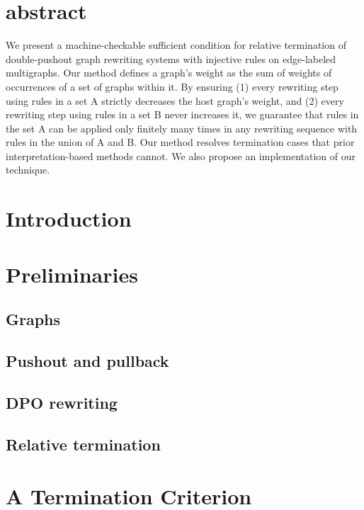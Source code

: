 \documentclass{book}
\begin{document}
\section{abstract}
We present a machine-checkable sufficient condition for relative termination of double-pushout graph rewriting systems with injective rules on edge-labeled multigraphs. 
Our method defines a graph's weight as the sum of weights of occurrences of a set of graphs within it. By ensuring 
(1) every rewriting step using rules in a set A strictly decreases the host graph's weight, and 
(2) every rewriting step using rules in a set B never increases it, we guarantee that rules in the set A can be applied only finitely many times in any rewriting sequence with rules in the union of A and B.  
Our method resolves termination cases that prior interpretation-based methods cannot. 
We also propose an implementation of our technique.

\section{Introduction}
\label{sec:intro}

\section{Preliminaries} 
\label{sec:pre} 

\subsection{Graphs}
 
\subsection{Pushout and pullback}  


\subsection{DPO rewriting} 


\subsection{Relative termination}

   
\section{A Termination Criterion} 
\label{sec:termination_criterion}
 
 
\end{document}
